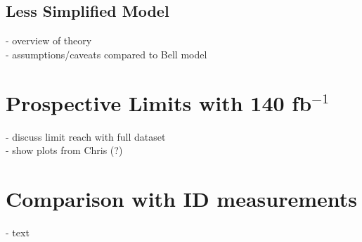 \subsection{Less Simplified Model}

- overview of theory\\
- assumptions/caveats compared to Bell model\\

\section{Prospective Limits with 140 fb$^{-1}$}

- discuss limit reach with full dataset\\
- show plots from Chris (?)\\

\section{Comparison with ID measurements}

- text